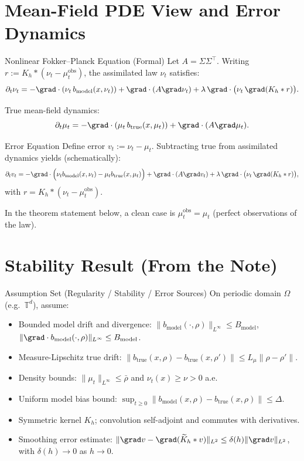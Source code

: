 \documentclass[aspectratio=169]{beamer}
\begin{document}
\section{Mean-Field PDE View and Error Dynamics}

\begin{frame}{Nonlinear Fokker--Planck Equation (Formal)}
Let $A=\Sigma\Sigma^\top$.
Writing $r := K_h*(\nu_t-\mu_t^{\text{obs}})$, the assimilated law $\nu_t$ satisfies:
\[
\partial_t \nu_t
= -\grad\cdot(\nu_t\, b_{\text{model}}(x,\nu_t))
+ \grad\cdot(A\grad \nu_t)
+ \lambda\, \grad\cdot\big(\nu_t\,\grad(K_h*r)\big).
\]

\medskip
True mean-field dynamics:
\[
\partial_t \mu_t
= -\grad\cdot(\mu_t\, b_{\text{true}}(x,\mu_t))
+ \grad\cdot(A\grad \mu_t).
\]
\end{frame}

\begin{frame}{Error Equation}
Define error $v_t := \nu_t-\mu_t$.
Subtracting true from assimilated dynamics yields (schematically):
\[
\partial_t v_t
= -\grad\cdot\Big(\nu_t b_{\text{model}}(x,\nu_t) - \mu_t b_{\text{true}}(x,\mu_t)\Big)
+ \grad\cdot(A\grad v_t)
+ \lambda\,\grad\cdot\big(\nu_t\,\grad(K_h*r)\big),
\]
with $r=K_h*(\nu_t-\mu_t^{\text{obs}})$.

\medskip
In the theorem statement below, a clean case is $\mu_t^{\text{obs}}=\mu_t$ (perfect observations of the law).
\end{frame}

\section{Stability Result (From the Note)}

\begin{frame}{Assumption Set (Regularity / Stability / Error Sources)}
On periodic domain $\Omega$ (e.g.\ $\mathbb{T}^d$), assume:

\begin{itemize}
  \item[(A1)] Bounded model drift and divergence:
  $\|b_{\text{model}}(\cdot,\rho)\|_{L^\infty}\le B_{\text{model}}$,
  $\|\grad\cdot b_{\text{model}}(\cdot,\rho)\|_{L^\infty}\le B_{\text{model}}$.
  \item[(A2)] Measure-Lipschitz true drift:
  $\|b_{\text{true}}(x,\rho)-b_{\text{true}}(x,\rho')\|\le L_\mu \|\rho-\rho'\|$.
  \item[(A3)] Density bounds: $\|\mu_t\|_{L^\infty}\le \bar\rho$ and $\nu_t(x)\ge \nu>0$ a.e.
  \item[(A4)] Uniform model bias bound:
  $\sup_{t\ge0}\|b_{\text{model}}(x,\rho)-b_{\text{true}}(x,\rho)\|\le \Delta$.
  \item[(A5)] Symmetric kernel $K_h$; convolution self-adjoint and commutes with derivatives.
  \item[(A6)] Smoothing error estimate:
  $\|\grad v - \grad(\widetilde K_h*v)\|_{L^2}\le \delta(h)\|\grad v\|_{L^2}$, with $\delta(h)\to0$ as $h\to0$.
\end{itemize}
\end{frame}
\end{document}
